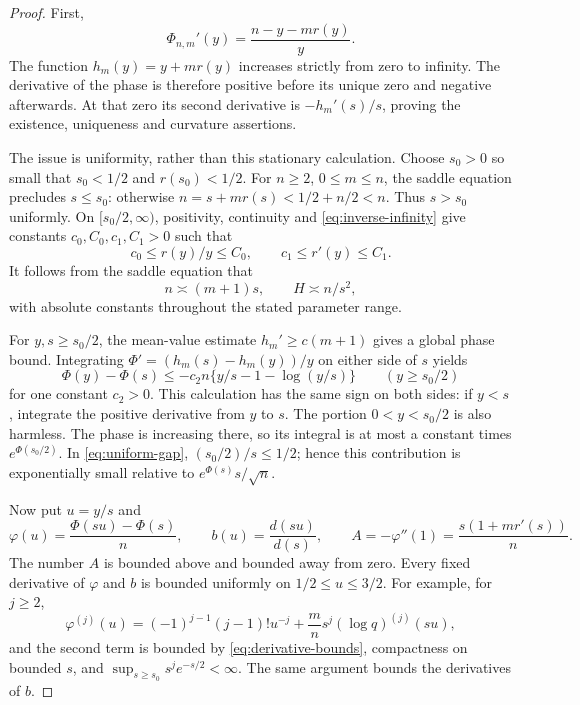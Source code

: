\documentclass[11pt,letterpaper]{article}
\theoremstyle{definition}
\theoremstyle{remark}
\begin{document}
\begin{proof}
First,
\[
 \Phi_{n,m}'(y)=\frac{n-y-mr(y)}{y}.
\]
The function $h_m(y)=y+mr(y)$ increases strictly from zero to infinity.
The derivative of the phase is therefore positive before its unique
zero and negative afterwards. At that zero its second derivative is
$-h_m'(s)/s$, proving the existence, uniqueness and curvature assertions.

The issue is uniformity, rather than this stationary calculation.
Choose $s_0>0$ so small that $s_0<1/2$ and $r(s_0)<1/2$.
For $n\ge2$, $0\le m\le n$, the saddle equation precludes $s\le s_0$:
otherwise $n=s+mr(s)<1/2+n/2<n$. Thus $s>s_0$ uniformly.
On $[s_0/2,\infty)$, positivity, continuity and
\eqref{eq:inverse-infinity} give constants $c_0,C_0,c_1,C_1>0$ such that
\begin{equation}\label{eq:uniform-comparability}
 c_0\le r(y)/y\le C_0,\qquad c_1\le r'(y)\le C_1.
\end{equation}
It follows from the saddle equation that
\[
 n\asymp(m+1)s,\qquad H\asymp n/s^2,
\]
with absolute constants throughout the stated parameter range.

For $y,s\ge s_0/2$, the mean-value estimate
$h_m'\ge c(m+1)$ gives a global phase bound. Integrating
$\Phi'=(h_m(s)-h_m(y))/y$ on either side of $s$ yields
\begin{equation}\label{eq:uniform-gap}
 \Phi(y)-\Phi(s)
 \le-c_2n\{y/s-1-\log(y/s)\}
 \qquad(y\ge s_0/2)
\end{equation}
for one constant $c_2>0$. This calculation has the same sign on both
sides: if $y<s$, integrate the positive derivative from $y$ to $s$.
The portion $0<y<s_0/2$ is also harmless. The phase is increasing there,
so its integral is at most a constant times
$e^{\Phi(s_0/2)}$. In \eqref{eq:uniform-gap},
$(s_0/2)/s\le1/2$; hence this contribution is exponentially small
relative to $e^{\Phi(s)}s/\sqrt n$.

Now put $u=y/s$ and
\[
 \varphi(u)=\frac{\Phi(su)-\Phi(s)}n,
 \qquad b(u)=\frac{d(su)}{d(s)},
 \qquad A=-\varphi''(1)=\frac{s(1+mr'(s))}{n}.
\]
The number $A$ is bounded above and bounded away from zero. Every fixed
derivative of $\varphi$ and $b$ is bounded uniformly on $1/2\le u\le3/2$.
For example, for $j\ge2$,
\[
 \varphi^{(j)}(u)
 =(-1)^{j-1}(j-1)!u^{-j}
   +\frac{m}{n}s^j(\log q)^{(j)}(su),
\]
and the second term is bounded by \eqref{eq:derivative-bounds}, compactness
on bounded $s$, and $\sup_{s\ge s_0}s^j e^{-s/2}<\infty$.
The same argument bounds the derivatives of $b$.


\end{proof}
\end{document}
